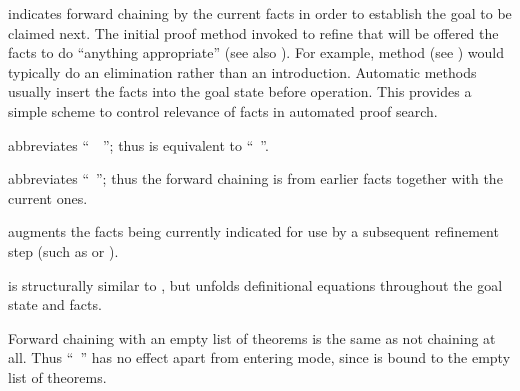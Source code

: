 \begin{isabellebody}
\begin{isamarkuptext}
\begin{descr}
  \item [\isa{\isacommand{then}}] indicates forward chaining by the current
  facts in order to establish the goal to be claimed next.  The
  initial proof method invoked to refine that will be offered the
  facts to do ``anything appropriate'' (see also
  ).  For example, method 
  (see ) would typically do an elimination
  rather than an introduction.  Automatic methods usually insert the
  facts into the goal state before operation.  This provides a simple
  scheme to control relevance of facts in automated proof search.
  
  \item [\isa{\isacommand{from}}~\isa{b}] abbreviates ``~~''; thus  is
  equivalent to ``~''.
  
  \item [\isa{\isacommand{with}}~\isa{b\isactrlsub {\isadigit{1}}\ {\isasymdots}\ b\isactrlsub n}]
  abbreviates ``~''; thus the forward chaining is from earlier facts together
  with the current ones.
  
  \item [\isa{\isacommand{using}}~\isa{b\isactrlsub {\isadigit{1}}\ {\isasymdots}\ b\isactrlsub n}] augments
  the facts being currently indicated for use by a subsequent
  refinement step (such as  or ).
  
  \item [\isa{\isacommand{unfolding}}~\isa{b\isactrlsub {\isadigit{1}}\ {\isasymdots}\ b\isactrlsub n}] is
  structurally similar to , but unfolds definitional
  equations  throughout the goal state
  and facts.

  \end{descr}

  Forward chaining with an empty list of theorems is the same as not
  chaining at all.  Thus ``~'' has no
  effect apart from entering  mode, since
   is bound to the empty list of theorems.


\end{isamarkuptext}
\end{isabellebody}
